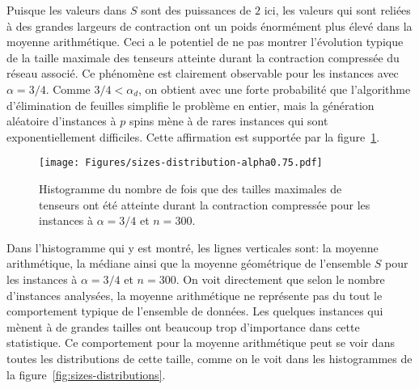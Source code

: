 Puisque les valeurs dans $S$ sont des puissances de $2$ ici, les valeurs qui sont reliées à des grandes largeurs de contraction ont un poids énormément plus élevé dans la moyenne arithmétique.
Ceci a le potentiel de ne pas montrer l'évolution typique de la taille maximale des tenseurs atteinte durant la contraction compressée du réseau associé.
Ce phénomène est clairement observable pour les instances avec $\alpha = 3/4$.
Comme $3/4 < \alpha_d$, on obtient avec une forte probabilité que l'algorithme d'élimination de feuilles simplifie le problème en entier, mais la génération aléatoire d'instances à $p$ spins mène à de rares instances qui sont exponentiellement difficiles.
Cette affirmation est supportée par la figure~\ref{fig:sizes-distribution}.
\begin{figure}[h]
    \centering
    \texttt{[image: Figures/sizes-distribution-alpha0.75.pdf]}
    \caption{Histogramme du nombre de fois que des tailles maximales de tenseurs ont été atteinte durant la contraction compressée pour les instances à $\alpha = 3/4$ et $n = 300$.}
    \label{fig:sizes-distribution}
\end{figure}
Dans l'histogramme qui y est montré, les lignes verticales sont: la moyenne arithmétique, la médiane ainsi que la moyenne géométrique de l'ensemble $S$ pour les instances à $\alpha = 3/4$ et $n = 300$.
On voit directement que selon le nombre d'instances analysées, la moyenne arithmétique ne représente pas du tout le comportement typique de l'ensemble de données.
Les quelques instances qui mènent à de grandes tailles ont beaucoup trop d'importance dans cette statistique.
Ce comportement pour la moyenne arithmétique peut se voir dans toutes les distributions de cette taille, comme on le voit dans les histogrammes de la figure~\ref{fig:sizes-distributions}.
